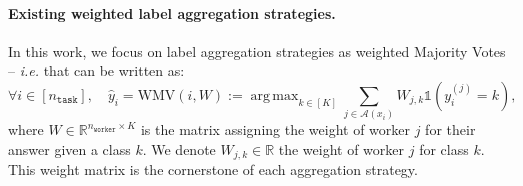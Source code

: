 \documentclass{cap2024}
\DeclareMathOperator*{\argmax}{arg\,max}
\begin{document}
\paragraph{Existing weighted label aggregation strategies.}

In this work, we focus on label aggregation strategies as weighted Majority Votes \citep{littlestone1994weighted} -- \emph{i.e.} that can be written as:
\begin{equation}
  \label{eq:wmv_general}
 \forall i \in [n_\texttt{task}], \quad \hat{y}_i = \text{WMV}(i, W):=\argmax_{k \in [K]} \sum_{j\in\mathcal{A}(x_i)} W_{j,k} \mathds{1}(y_i^{(j)} = k),
\end{equation}
where $W \in \mathbb{R}^{n_\texttt{worker}\times K}$ is the matrix assigning the weight of worker $j$ for their answer given a class $k$.
We denote $W_{j,k}\in\mathbb{R}$ the weight of worker $j$ for class $k$.
This weight matrix is the cornerstone of each aggregation strategy.
\end{document}
